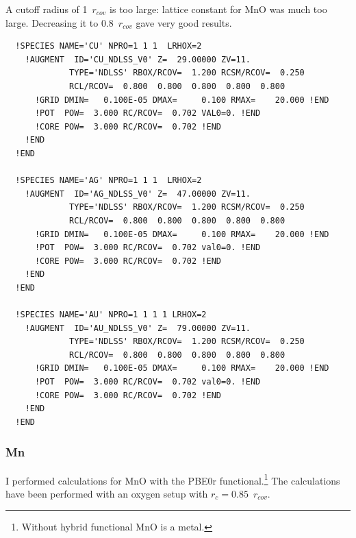 \documentclass[11pt,a4paper]{report}
\begin{document}
A cutoff radius of 1~$r_{cov}$ is too large: lattice constant for MnO
was much too large. Decreasing it to 0.8~$r_{cov}$ gave very good results.



\begin{verbatim}
  !SPECIES NAME='CU' NPRO=1 1 1  LRHOX=2 
    !AUGMENT  ID='CU_NDLSS_V0' Z=  29.00000 ZV=11.
             TYPE='NDLSS' RBOX/RCOV=  1.200 RCSM/RCOV=  0.250
             RCL/RCOV=  0.800  0.800  0.800  0.800  0.800
      !GRID DMIN=   0.100E-05 DMAX=     0.100 RMAX=    20.000 !END
      !POT  POW=  3.000 RC/RCOV=  0.702 VAL0=0. !END
      !CORE POW=  3.000 RC/RCOV=  0.702 !END
    !END
  !END

  !SPECIES NAME='AG' NPRO=1 1 1  LRHOX=2 
    !AUGMENT  ID='AG_NDLSS_V0' Z=  47.00000 ZV=11.
             TYPE='NDLSS' RBOX/RCOV=  1.200 RCSM/RCOV=  0.250
             RCL/RCOV=  0.800  0.800  0.800  0.800  0.800
      !GRID DMIN=   0.100E-05 DMAX=     0.100 RMAX=    20.000 !END
      !POT  POW=  3.000 RC/RCOV=  0.702 val0=0. !END
      !CORE POW=  3.000 RC/RCOV=  0.702 !END
    !END
  !END

  !SPECIES NAME='AU' NPRO=1 1 1 1 LRHOX=2 
    !AUGMENT  ID='AU_NDLSS_V0' Z=  79.00000 ZV=11.
             TYPE='NDLSS' RBOX/RCOV=  1.200 RCSM/RCOV=  0.250
             RCL/RCOV=  0.800  0.800  0.800  0.800  0.800
      !GRID DMIN=   0.100E-05 DMAX=     0.100 RMAX=    20.000 !END
      !POT  POW=  3.000 RC/RCOV=  0.702 val0=0. !END
      !CORE POW=  3.000 RC/RCOV=  0.702 !END
    !END
  !END
\end{verbatim}



\subsubsection{Mn}
I performed calculations for MnO with the PBE0r
functional.\footnote{Without hybrid functional MnO is a metal.}  The
calculations have been performed with an oxygen setup with
$r_c=0.85$~$r_{cov}$. 
\end{document}
